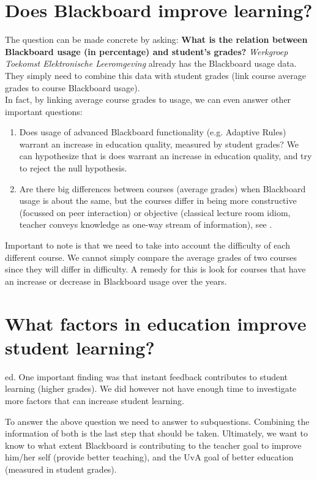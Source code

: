 \section{Does Blackboard improve learning?}
The question can be made concrete by asking:\textbf{ What is the relation between Blackboard usage (in percentage) and student's grades?} \textit{Werkgroep Toekomst Elektronische Leeromgeving} already has the Blackboard usage data. They simply need to combine this data with student grades (link course average grades to course Blackboard usage). \\

In fact, by linking average course grades to usage, we can even answer other important questions:
\begin{enumerate}
	\item Does usage of advanced Blackboard functionality (e.g. Adaptive Rules) warrant an increase in education quality, measured by student grades? We can hypothesize that is does warrant an increase in education quality, and try to reject the null hypothesis.
	\item Are there big differences between courses (average grades) when Blackboard usage is about the same, but the courses differ in being more constructive (focussed on peer interaction) or objective (classical lecture room idiom, teacher conveys knowledge as one-way stream of information), see \cite{improveEducationWithIt}. 
\end{enumerate}

Important to note is that we need to take into account the difficulty of each different course. We cannot simply compare the average grades of two courses since they will differ in difficulty. A remedy for this is look for courses that have an increase or decrease in Blackboard usage over the years. 
\section{What factors in education improve student learning?}
ed. One important finding was that instant feedback contributes to student learning (higher grades). We did however not have enough time to investigate more factors that can increase student learning. 

To answer the above question we need to answer to subquestions. Combining the information of both is the last step that should be taken. Ultimately, we want to know to what extent Blackboard is contributing to the teacher goal to improve him/her self (provide better teaching), and the UvA goal of better education (measured in student grades).


